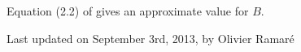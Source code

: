 Equation (2.2) of
\cite{Rosser-Schoenfeld*62}
gives an approximate value for $B$.










  
  Last updated on September 3rd, 2013, by Olivier Ramar\'e
















